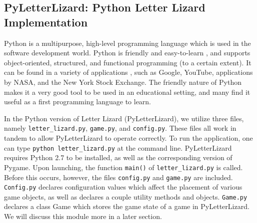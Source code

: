 \documentclass[11pt]{article}
\begin{document}
\subsection{PyLetterLizard: Python Letter Lizard Implementation}







Python is a multipurpose, high-level programming language which is used  in the software development world. Python is friendly and easy-to-learn \cite{about_python}, and supports object-oriented, structured, and functional programming (to a certain extent). It can be found in a variety of applications \cite{whatis_python}, such as Google, YouTube, applications by NASA, and the New York Stock Exchange. The friendly nature of Python makes it a very good tool to be used in an educational setting, and many find it useful as a first programming language to learn.
	
	
	In the Python version of Letter Lizard (PyLetterLizard), we utilize three files, namely \texttt{letter\_lizard.py}, \texttt{game.py}, and \texttt{config.py}. These files all work in tandem to allow PyLetterLizard to operate correctly. To run the application, one can type \texttt{python letter\_lizard.py} at the command line. PyLetterLizard requires Python 2.7 to be installed, as well as the corresponding version of Pygame.  Upon launching, the function \texttt{main()} of \texttt{letter\_lizard.py} is called. Before this occurs, however, the files \texttt{config.py} and \texttt{game.py} are included. \texttt{Config.py} declares configuration values which affect the placement of various game objects, as well as declares a couple utility methods and objects. \texttt{Game.py} declares a class Game which stores the game state of a game in PyLetterLizard. We will discuss this module more in a later section.
	
\end{document}
